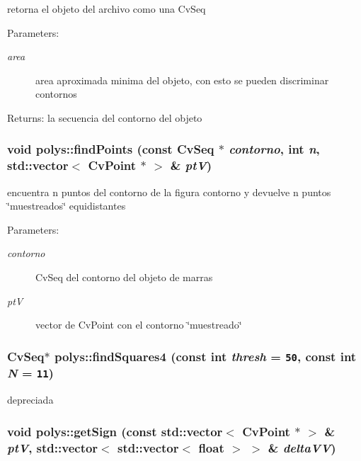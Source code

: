 retorna el objeto del archivo como una CvSeq

\begin{Desc}
\item[Parameters:]
\begin{description}
\item[{\em area}]area aproximada minima del objeto, con esto se pueden discriminar contornos\end{description}
\end{Desc}
\begin{Desc}
\item[Returns:]la secuencia del contorno del objeto \end{Desc}
\hypertarget{classpolys_a47d2d9725c7d2c3686c410d8b536ad7}{
\subsubsection[{findPoints}]{\setlength{\rightskip}{0pt plus 5cm}void polys::findPoints (const CvSeq $\ast$ {\em contorno}, \/  int {\em n}, \/  std::vector$<$ CvPoint $\ast$ $>$ \& {\em ptV})}}
\label{classpolys_a47d2d9725c7d2c3686c410d8b536ad7}


encuentra n puntos del contorno de la figura contorno y devuelve n puntos \char`\"{}muestreados\char`\"{} equidistantes

\begin{Desc}
\item[Parameters:]
\begin{description}
\item[{\em contorno}]CvSeq del contorno del objeto de marras \item[{\em ptV}]vector de CvPoint con el contorno \char`\"{}muestreado\char`\"{} \end{description}
\end{Desc}
\hypertarget{classpolys_a8e9ae3faba2b964f75920f31384f3eb}{
\subsubsection[{findSquares4}]{\setlength{\rightskip}{0pt plus 5cm}CvSeq$\ast$ polys::findSquares4 (const int {\em thresh} = {\tt 50}, \/  const int {\em N} = {\tt 11})}}
\label{classpolys_a8e9ae3faba2b964f75920f31384f3eb}


depreciada \hypertarget{classpolys_e6a62f459667bbb2ff27dd0b89b07cd6}{
\subsubsection[{getSign}]{\setlength{\rightskip}{0pt plus 5cm}void polys::getSign (const std::vector$<$ CvPoint $\ast$ $>$ \& {\em ptV}, \/  std::vector$<$ std::vector$<$ float $>$ $>$ \& {\em deltaVV})}}
\label{classpolys_e6a62f459667bbb2ff27dd0b89b07cd6}


